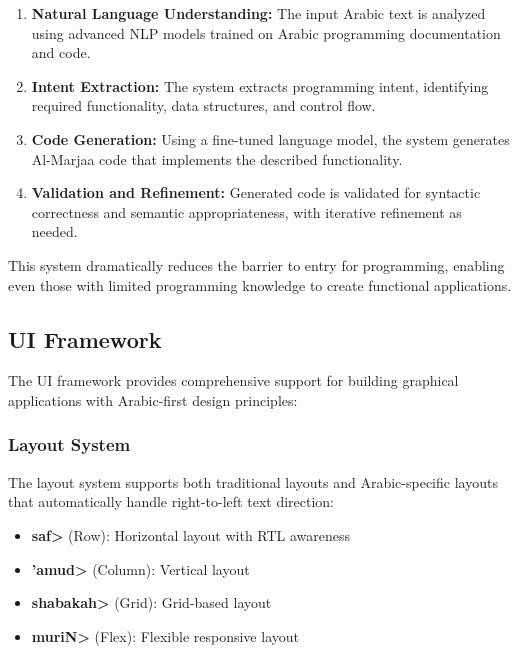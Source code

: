 \documentclass[11pt,a4paper]{article}
\begin{document}
\begin{enumerate}
    \item \textbf{Natural Language Understanding:} The input Arabic text is analyzed using advanced NLP models trained on Arabic programming documentation and code.
    
    \item \textbf{Intent Extraction:} The system extracts programming intent, identifying required functionality, data structures, and control flow.
    
    \item \textbf{Code Generation:} Using a fine-tuned language model, the system generates Al-Marjaa code that implements the described functionality.
    
    \item \textbf{Validation and Refinement:} Generated code is validated for syntactic correctness and semantic appropriateness, with iterative refinement as needed.
\end{enumerate}

This system dramatically reduces the barrier to entry for programming, enabling even those with limited programming knowledge to create functional applications.

\subsection{UI Framework}

The UI framework provides comprehensive support for building graphical applications with Arabic-first design principles:

\subsubsection{Layout System}

The layout system supports both traditional layouts and Arabic-specific layouts that automatically handle right-to-left text direction:

\begin{itemize}
    \item \textbf{\<saf>} (Row): Horizontal layout with RTL awareness
    \item \textbf{\<'amud>} (Column): Vertical layout
    \item \textbf{\<shabakah>} (Grid): Grid-based layout
    \item \textbf{\<muriN>} (Flex): Flexible responsive layout
\end{itemize}
\end{document}
